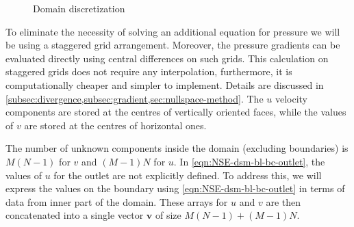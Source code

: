 \documentclass{article}
\numberwithin{equation}{section}
\begin{document}
\begin{figure}[H] %
  \caption{Domain discretization}\label{bl-domain-discretization}
\end{figure}

To eliminate the necessity of solving an additional equation for pressure we will be using a staggered grid arrangement. 
Moreover, the pressure gradients can be evaluated directly using central differences on such grids. 
This calculation on staggered grids does not require any interpolation, furthermore, it is computationally cheaper and simpler to implement. 
Details are discussed in \cref{subsec:divergence,subsec:gradient,sec:nullspace-method}. 
The $u$ velocity components are stored at the centres of vertically oriented faces, while the values of $v$ are stored at the centres of horizontal ones. 

The number of unknown components inside the domain (excluding boundaries) is $M(N-1)$ for $v$ and $(M-1)N$ for $u$. In \cref{eqn:NSE-dsm-bl-bc-outlet}, the values of $u$ for the outlet are not explicitly defined. To address this, we will express the values on the boundary using \cref{eqn:NSE-dsm-bl-bc-outlet} in terms of data from inner part of the domain. These arrays for $u$ and $v$ are then concatenated into a single vector $\boldsymbol{v}$ of size $M(N-1)+(M-1)N$.
\end{document}
